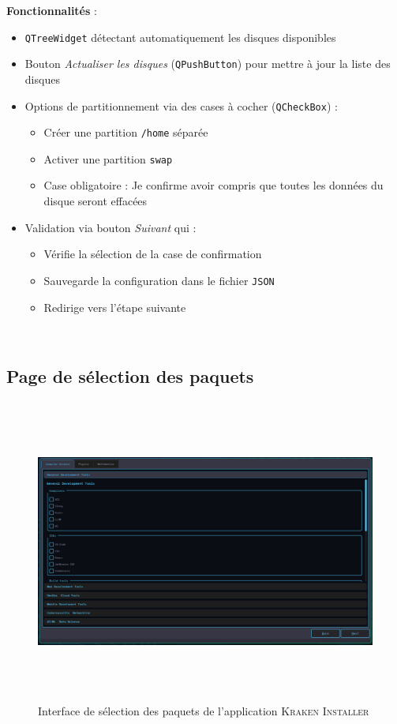 \textbf{Fonctionnalités} :
\begin{itemize}
    \item \texttt{QTreeWidget} détectant automatiquement les disques disponibles
    \item Bouton \textit{Actualiser les disques} (\texttt{QPushButton}) pour mettre à jour la liste des disques 
    \item Options de partitionnement via des cases à cocher (\texttt{QCheckBox}) :
    \begin{itemize}
        \item Créer une partition \texttt{/home} séparée
        \item Activer une partition \texttt{swap}
        \item Case obligatoire :  Je confirme avoir compris que toutes les données du disque seront effacées
    \end{itemize}
    \item Validation via bouton \textit{Suivant} qui :
    \begin{itemize}
        \item Vérifie la sélection de la case de confirmation
        \item Sauvegarde la configuration dans le fichier \texttt{JSON}
        \item Redirige vers l'étape suivante
    \end{itemize}
\end{itemize}

\


\subsection{Page de sélection des paquets}



\label{subsec:package-selection}
\begin{figure}[H]
  \centering
  \includegraphics[width=1\textwidth, height=10cm]{images_pfe/packages.png}
  \caption{Interface de sélection des paquets de l'application \textsc{Kraken Installer}}
  \label{fig:packagepage}
\end{figure}



